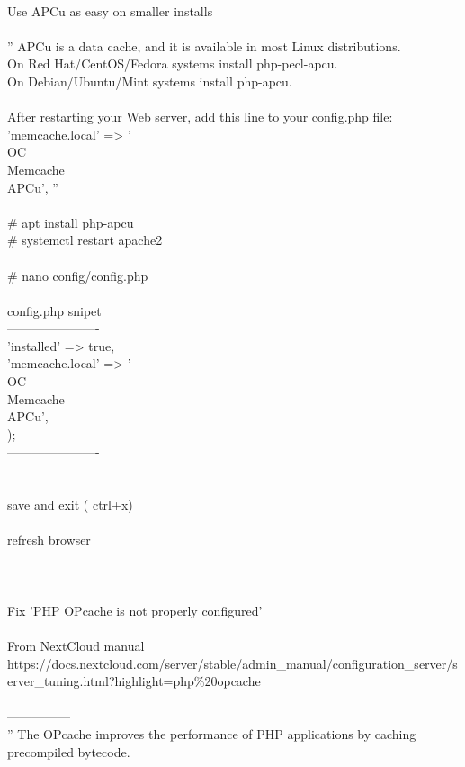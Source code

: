 \documentclass[10pt,a4paper]{article}
\begin{document}
{\\
		Use APCu as easy on smaller installs\\
\\
		'' APCu is a data cache, and it is available in most Linux distributions. \\
		On Red Hat/CentOS/Fedora systems install php-pecl-apcu. \\
		On Debian/Ubuntu/Mint systems install php-apcu.\\
\\
		After restarting your Web server, add this line to your config.php file: 'memcache.local' => '\\OC\\Memcache\\APCu',  ''\\
\\
		\# apt install php-apcu\\
		\# systemctl restart apache2\\
\\
		\# nano config/config.php\\
		\\
		config.php snipet\\
		----------------------\\
		  'installed' => true,\\
		  'memcache.local' => '\\OC\\Memcache\\APCu',\\
		);\\
		----------------------\\
\\
\\
		save and exit  ( ctrl+x)\\
\\
		refresh browser\\
\\
\\
		\\
	Fix 'PHP OPcache is not properly configured'\\
\\
		From NextCloud manual https://docs.nextcloud.com/server/stable/admin\_manual/configuration\_server/server\_tuning.html?highlight=php\%20opcache}{\large \\
			\\
	---------------\\
	'' The OPcache improves the performance of PHP applications by caching precompiled bytecode. \\
}
\end{document}

